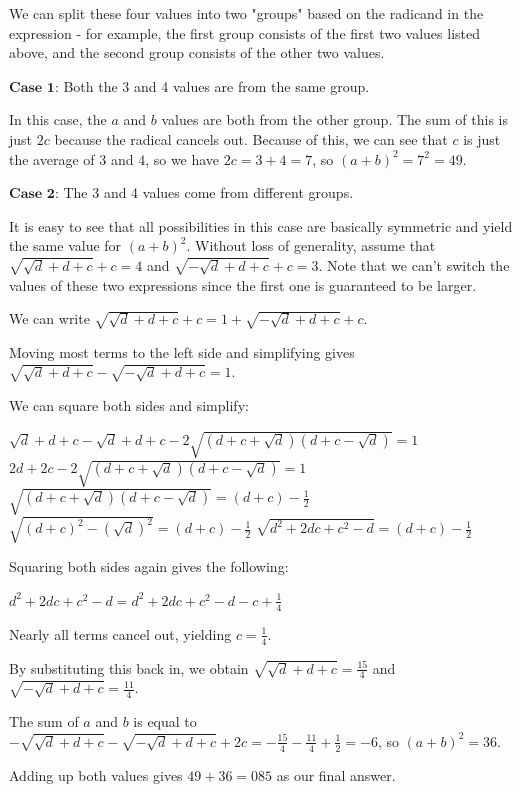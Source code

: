 \begin{enumerate}
 We can split these four values into two "groups" based on the radicand in the expression - for example, the first group consists of the first two values listed above, and the second group consists of the other two values.

 $\textbf{Case 1}$: Both the 3 and 4 values are from the same group.

 In this case, the $a$ and $b$ values are both from the other group. The sum of this is just $2c$ because the radical cancels out. Because of this, we can see that $c$ is just the average of $3$ and $4$, so we have $2c = 3 + 4 = 7$, so $(a+b)^2 = 7^2 = 49$.

 $\textbf{Case 2}$: The 3 and 4 values come from different groups.

 It is easy to see that all possibilities in this case are basically symmetric and yield the same value for $(a+b)^2$. Without loss of generality, assume that $\sqrt{\sqrt{d} + d + c} + c = 4$ and $\sqrt{-\sqrt{d} + d + c} + c = 3$. Note that we can't switch the values of these two expressions since the first one is guaranteed to be larger.

 We can write $\sqrt{\sqrt{d} + d + c} + c = 1 + \sqrt{-\sqrt{d} + d + c} + c$.

 Moving most terms to the left side and simplifying gives $\sqrt{\sqrt{d} + d + c} - \sqrt{-\sqrt{d} + d + c} = 1$.

 We can square both sides and simplify:

 $\sqrt{d} + d + c - \sqrt{d} + d + c - 2\sqrt{(d + c + \sqrt{d})(d + c - \sqrt{d})} = 1$
$2d + 2c - 2\sqrt{(d + c + \sqrt{d})(d + c - \sqrt{d})} = 1$
$\sqrt{(d + c + \sqrt{d})(d + c - \sqrt{d})} = (d+c) - \frac{1}{2}$
$\sqrt{(d+c)^2 - (\sqrt{d})^2} = (d+c) - \frac{1}{2}$
$\sqrt{d^2 + 2dc + c^2 - d} = (d+c) - \frac{1}{2}$

 Squaring both sides again gives the following:

 $d^2 + 2dc + c^2 - d = d^2 + 2dc + c^2 - d - c + \frac{1}{4}$

 Nearly all terms cancel out, yielding $c = \frac{1}{4}$.

 By substituting this back in, we obtain $\sqrt{\sqrt{d} + d + c} = \frac{15}{4}$ and $\sqrt{-\sqrt{d} + d + c} = \frac{11}{4}$.

 The sum of $a$ and $b$ is equal to $-\sqrt{\sqrt{d} + d + c} - \sqrt{-\sqrt{d} + d + c} + 2c = -\frac{15}{4} - \frac{11}{4} + \frac{1}{2} = -6$, so $(a+b)^2 = 36$.

 Adding up both values gives $49 + 36 = \boxed{085}$ as our final answer.


\end{enumerate}
